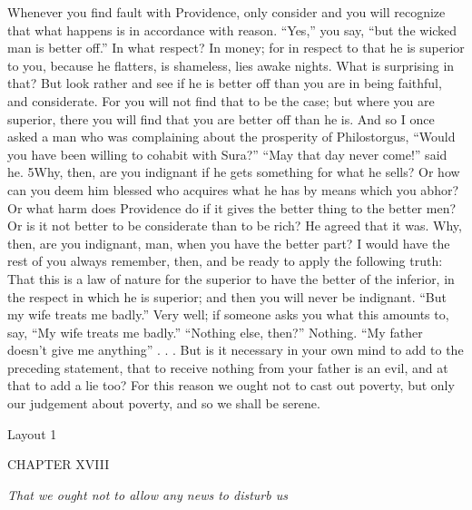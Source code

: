 Whenever you find fault with Providence, only consider and you will recognize that what happens is in accordance with reason. ``Yes,'' you say, ``but the wicked man is better off.'' In what respect? In money; for in respect to that he is superior to you, because he flatters, is shameless, lies awake nights. What is surprising in that? But look rather and see if he is better off than you are in being faithful, and considerate. For you will not find that to be the case; but where you are superior, there you will find that you are better off than he is. And so I once asked a man who was complaining about the prosperity of Philostorgus, ``Would you have been willing to cohabit with Sura?'' ``May that day never come!'' said he. 5Why, then, are you indignant if he gets something for what he sells? Or how can you deem him blessed who acquires what he has by means which you abhor? Or what harm does Providence do if it gives the better thing to the better men? Or is it not better to be considerate than to be rich? He agreed that it was. Why, then, are you indignant, man, when you have the better part? I would have the rest of you always remember, then, and be ready to apply the following truth: That this is a law of nature for the superior to have the better of the inferior, in the respect in which he is superior; and then you will never be indignant. ``But my wife treats me badly.'' Very well; if someone asks you what this amounts to, say, ``My wife treats me badly.'' ``Nothing else, then?'' Nothing. ``My father doesn't give me anything'' . . . But is it necessary in your own mind to add to the preceding statement, that to receive nothing from your father is an evil, and at that to add a lie too? For this reason we ought not to cast out poverty, but only our judgement about poverty, and so we shall be serene.



Layout 1

CHAPTER XVIII

\emph{That we ought not to allow any news to disturb us}

